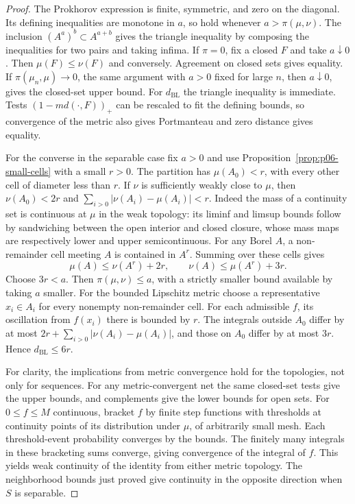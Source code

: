 \documentclass[11pt,oneside,openany]{book}
\theoremstyle{plain}
\theoremstyle{definition}
\theoremstyle{remark}
\begin{document}
\begin{proof}
The Prokhorov expression is finite, symmetric, and zero on the
diagonal. Its defining inequalities are monotone in \(a\), so hold
whenever \(a>\pi(\mu,\nu)\). The inclusion
\((A^a)^b\subset A^{a+b}\) gives the triangle inequality by composing
the inequalities for two pairs and taking infima. If \(\pi=0\),
fix a closed \(F\) and take \(a\downarrow0\). Then
\(\mu(F)\leq\nu(F)\) and conversely. Agreement on closed sets
gives equality. If \(\pi(\mu_n,\mu)\to0\), the same argument with
\(a>0\) fixed for large \(n\), then \(a\downarrow0\), gives the
closed-set upper bound. For \(d_{\mathrm{BL}}\) the triangle
inequality is immediate. Tests \((1-m d(\cdot,F))_+\) can be
rescaled to fit the defining bounds, so convergence of the metric
also gives Portmanteau and zero distance gives equality.

For the converse in the separable case fix \(a>0\) and use
Proposition~\ref{prop:p06-small-cells} with a small \(r>0\).
The partition has \(\mu(A_0)<r\), with every other cell of
diameter less than \(r\). If \(\nu\) is sufficiently weakly close
to \(\mu\), then \(\nu(A_0)<2r\) and
\(\sum_{i>0}|\nu(A_i)-\mu(A_i)|<r\).
Indeed the mass of a continuity set is continuous at \(\mu\) in
the weak topology: its liminf and limsup bounds follow by
sandwiching between the open interior and closed closure, whose
mass maps are respectively lower and upper semicontinuous.
For any Borel \(A\), a non-remainder cell meeting \(A\) is
contained in \(A^r\). Summing over these cells gives
\[
 \mu(A)\leq\nu(A^r)+2r,\qquad
 \nu(A)\leq\mu(A^r)+3r.
\]
Choose \(3r<a\). Then \(\pi(\mu,\nu)\leq a\), with a strictly
smaller bound available by taking \(a\) smaller. For the bounded
Lipschitz metric choose a representative \(x_i\in A_i\) for every
nonempty non-remainder cell. For each admissible \(f\), its
oscillation from \(f(x_i)\) there is bounded by \(r\).
The integrals outside \(A_0\) differ by at most
\(2r+\sum_{i>0}|\nu(A_i)-\mu(A_i)|\), and those on \(A_0\)
differ by at most \(3r\). Hence \(d_{\mathrm{BL}}\leq6r\).

For clarity, the implications from metric convergence hold
for the topologies, not only for sequences. For any metric-convergent
net the same closed-set tests give the upper bounds, and
complements give the lower bounds for open sets.
For \(0\leq f\leq M\) continuous, bracket \(f\) by finite step
functions with thresholds at continuity points of its distribution
under \(\mu\), of arbitrarily small mesh. Each threshold-event
probability converges by the bounds. The finitely many
integrals in these bracketing sums converge, giving convergence
of the integral of \(f\). This yields weak continuity of the
identity from either metric topology. The neighborhood bounds
just proved give continuity in the opposite direction when \(S\)
is separable.
\end{proof}
\end{document}
